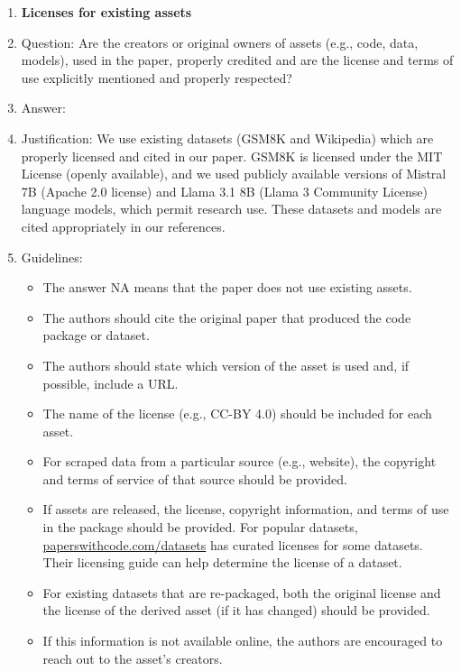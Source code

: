 \documentclass{article}
\begin{document}
\begin{enumerate}
\item {\bf Licenses for existing assets}
    \item[] Question: Are the creators or original owners of assets (e.g., code, data, models), used in the paper, properly credited and are the license and terms of use explicitly mentioned and properly respected?
    \item[] Answer: \answerYes{} %
    \item[] Justification: We use existing datasets (GSM8K and Wikipedia) which are properly licensed and cited in our paper. GSM8K is licensed under the MIT License (openly available), and we used publicly available versions of Mistral 7B (Apache 2.0 license) and Llama 3.1 8B (Llama 3 Community License) language models, which permit research use. These datasets and models are cited appropriately in our references.
    \item[] Guidelines:
    \begin{itemize}
        \item The answer NA means that the paper does not use existing assets.
        \item The authors should cite the original paper that produced the code package or dataset.
        \item The authors should state which version of the asset is used and, if possible, include a URL.
        \item The name of the license (e.g., CC-BY 4.0) should be included for each asset.
        \item For scraped data from a particular source (e.g., website), the copyright and terms of service of that source should be provided.
        \item If assets are released, the license, copyright information, and terms of use in the package should be provided. For popular datasets, \url{paperswithcode.com/datasets} has curated licenses for some datasets. Their licensing guide can help determine the license of a dataset.
        \item For existing datasets that are re-packaged, both the original license and the license of the derived asset (if it has changed) should be provided.
        \item If this information is not available online, the authors are encouraged to reach out to the asset's creators.
    \end{itemize}


\end{enumerate}
\end{document}
